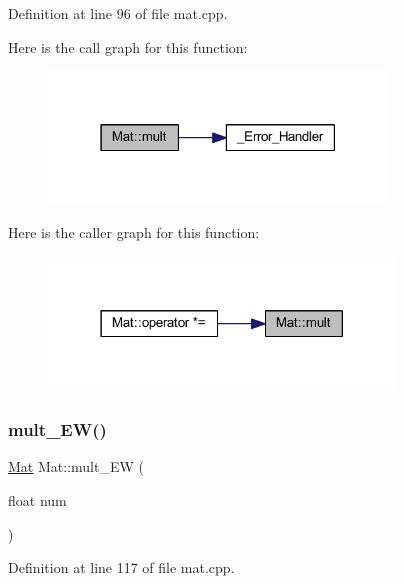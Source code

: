 Definition at line 96 of file mat.\+cpp.

Here is the call graph for this function\+:
\nopagebreak
\begin{figure}[H]
\begin{center}
\leavevmode
\includegraphics[width=255pt]{class_mat_a03d3322fef7fcc6d52fe141171c5fa04_cgraph}
\end{center}
\end{figure}
Here is the caller graph for this function\+:
\nopagebreak
\begin{figure}[H]
\begin{center}
\leavevmode
\includegraphics[width=261pt]{class_mat_a03d3322fef7fcc6d52fe141171c5fa04_icgraph}
\end{center}
\end{figure}
\mbox{\label{class_mat_a1de36bf60c84341c1f94494a4d42e5aa}} 
\subsubsection{\texorpdfstring{mult\_EW()}{mult\_EW()}}
{\footnotesize\ttfamily \mbox{\hyperlink{class_mat}{Mat}} Mat\+::mult\+\_\+\+EW (\begin{DoxyParamCaption}\item[{float}]{num }\end{DoxyParamCaption})}



Definition at line 117 of file mat.\+cpp.

\mbox{\label{class_mat_aaf9946bb579ab98e5f1b3c554da11cc9}} 
